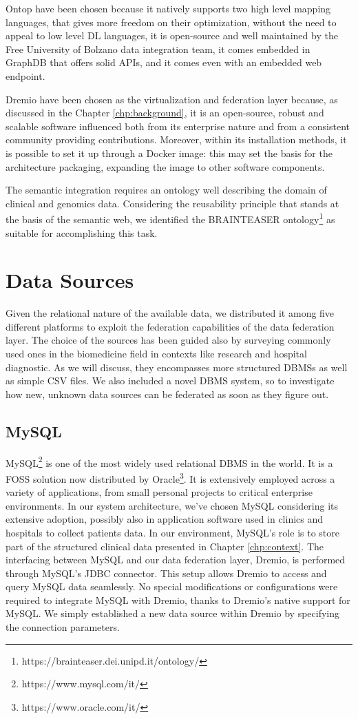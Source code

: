 Ontop have been chosen because it natively supports two high level mapping languages, that gives more freedom on their optimization, without the need to appeal to low level \ac{DL} languages, it is open-source and well maintained by the Free University of Bolzano data integration team, it comes embedded in GraphDB that offers solid \ac{API}s, and it comes even with an embedded web endpoint.

Dremio have been chosen as the virtualization and federation layer because, as discussed in the Chapter \ref{chp:background}, it is an open-source, robust and scalable software influenced both from its enterprise nature and from a consistent community providing contributions. Moreover, within its installation methods, it is possible to set it up through a Docker image: this may set the basis for the architecture packaging, expanding the image to other software components.

The semantic integration requires an ontology well describing the domain of clinical and genomics data. Considering the reusability principle that stands at the basis of the semantic web, we identified the \ac{BRAINTEASER} ontology\footnote{https://brainteaser.dei.unipd.it/ontology/} as suitable for accomplishing this task. 

\section{Data Sources}
Given the relational nature of the available data, we distributed it among five different platforms to exploit the federation capabilities of the data federation layer. The choice of the sources has been guided also by surveying commonly used ones in the biomedicine field in contexts like research and hospital diagnostic. As we will discuss, they encompasses more structured \ac{DBMS}s as well as simple \ac{CSV} files. We also included a novel \ac{DBMS} system, so to investigate how new, unknown data sources can be federated as soon as they figure out.

\subsection{MySQL}
MySQL\footnote{https://www.mysql.com/it/} is one of the most widely used relational \ac{DBMS} in the world. It is a \ac{FOSS} solution now distributed by Oracle\footnote{https://www.oracle.com/it/}. It is extensively employed across a variety of applications, from small personal projects to critical enterprise environments. In our system architecture, we've chosen MySQL considering its extensive adoption, possibly also in application software used in clinics and hospitals to collect patients data. 
In our environment, MySQL's role is to store part of the structured clinical data presented in Chapter \ref{chp:context}. 
The interfacing between MySQL and our data federation layer, Dremio, is performed through MySQL's \ac{JDBC} connector. This setup allows Dremio to access and query MySQL data seamlessly.
No special modifications or configurations were required to integrate MySQL with Dremio, thanks to Dremio's native support for MySQL. We simply established a new data source within Dremio by specifying the connection parameters.

